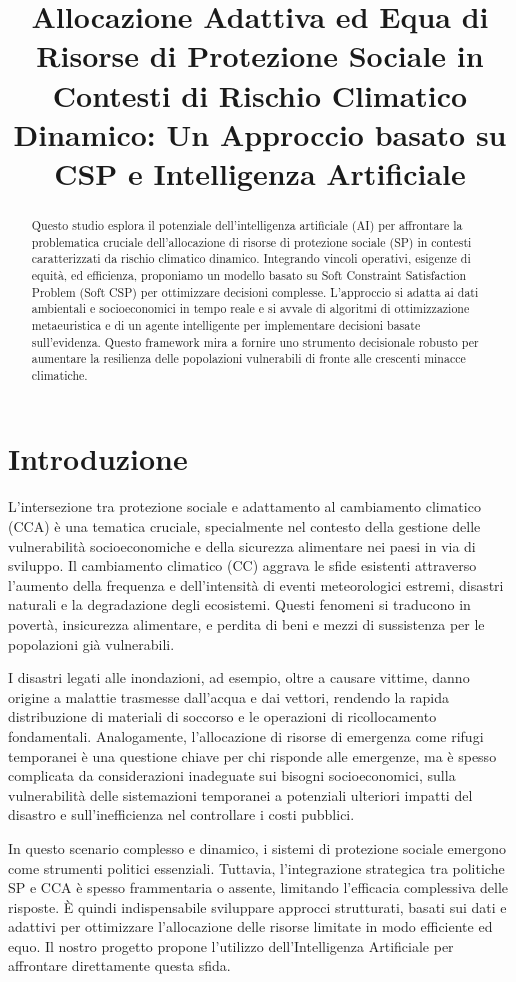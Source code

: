 \documentclass{article}
\title{Allocazione Adattiva ed Equa di Risorse di Protezione Sociale in Contesti di Rischio Climatico Dinamico: Un Approccio basato su CSP e Intelligenza Artificiale}
\author{}
\date{}
\begin{document}
\maketitle

\begin{abstract}
    Questo studio esplora il potenziale dell'intelligenza artificiale (AI) per affrontare la problematica cruciale dell'allocazione di risorse di protezione sociale (SP) in contesti caratterizzati da rischio climatico dinamico. Integrando vincoli operativi, esigenze di equità, ed efficienza, proponiamo un modello basato su Soft Constraint Satisfaction Problem (Soft CSP) per ottimizzare decisioni complesse. L'approccio si adatta ai dati ambientali e socioeconomici in tempo reale e si avvale di algoritmi di ottimizzazione metaeuristica e di un agente intelligente per implementare decisioni basate sull'evidenza. Questo framework mira a fornire uno strumento decisionale robusto per aumentare la resilienza delle popolazioni vulnerabili di fronte alle crescenti minacce climatiche.
\end{abstract}

\section{Introduzione}
L'intersezione tra protezione sociale e adattamento al cambiamento climatico (CCA) è una tematica cruciale, specialmente nel contesto della gestione delle vulnerabilità socioeconomiche e della sicurezza alimentare nei paesi in via di sviluppo. Il cambiamento climatico (CC) aggrava le sfide esistenti attraverso l'aumento della frequenza e dell'intensità di eventi meteorologici estremi, disastri naturali e la degradazione degli ecosistemi. Questi fenomeni si traducono in povertà, insicurezza alimentare, e perdita di beni e mezzi di sussistenza per le popolazioni già vulnerabili.

I disastri legati alle inondazioni, ad esempio, oltre a causare vittime, danno origine a malattie trasmesse dall'acqua e dai vettori, rendendo la rapida distribuzione di materiali di soccorso e le operazioni di ricollocamento fondamentali. Analogamente, l'allocazione di risorse di emergenza come rifugi temporanei è una questione chiave per chi risponde alle emergenze, ma è spesso complicata da considerazioni inadeguate sui bisogni socioeconomici, sulla vulnerabilità delle sistemazioni temporanei a potenziali ulteriori impatti del disastro e sull'inefficienza nel controllare i costi pubblici.

In questo scenario complesso e dinamico, i sistemi di protezione sociale emergono come strumenti politici essenziali. Tuttavia, l'integrazione strategica tra politiche SP e CCA è spesso frammentaria o assente, limitando l'efficacia complessiva delle risposte. È quindi indispensabile sviluppare approcci strutturati, basati sui dati e adattivi per ottimizzare l'allocazione delle risorse limitate in modo efficiente ed equo. Il nostro progetto propone l'utilizzo dell'Intelligenza Artificiale per affrontare direttamente questa sfida.
\end{document}
